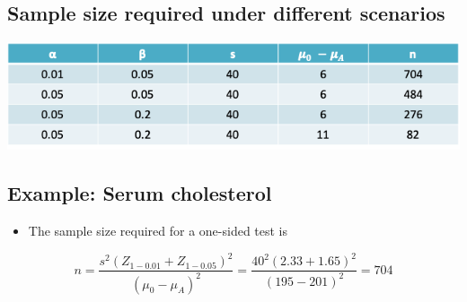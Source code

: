 \documentclass[
]{book}
\providecommand{\tightlist}{%
  \setlength{\itemsep}{0pt}\setlength{\parskip}{0pt}}
\begin{document}
\hypertarget{sample-size-required-under-different-scenarios}{%
\subsection{Sample size required under different scenarios}\label{sample-size-required-under-different-scenarios}}

\includegraphics[width=1\linewidth]{./4_58}

\hypertarget{example-serum-cholesterol}{%
\subsection{Example: Serum cholesterol}\label{example-serum-cholesterol}}

\begin{itemize}
\tightlist
\item
  The sample size required for a one-sided test is
\end{itemize}

\[n = \frac{s^2(Z_{1-0.01}+Z_{1-0.05})^2}{(\mu_0-\mu_A)^2}=\frac{40^2(2.33+1.65)^2}{(195-201)^2}=704\]
\end{document}
